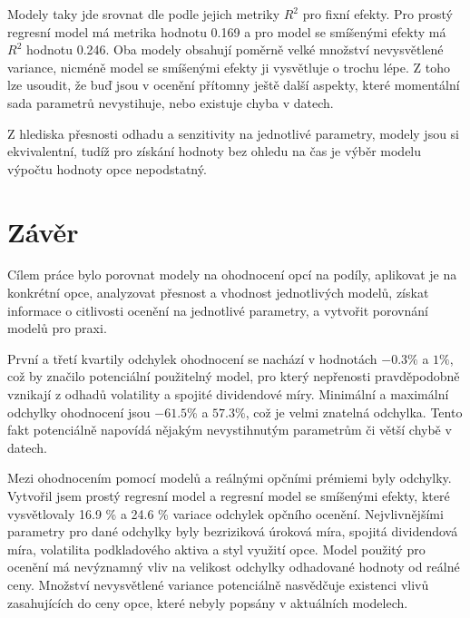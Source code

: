 \documentclass[male,czech,api_bc]{kitheses}
\begin{document}
  Modely taky jde srovnat dle podle jejich metriky $R^2$ pro fixní efekty. Pro prostý regresní model má metrika hodnotu 0.169 a pro model se smíšenými efekty má $R^2$ hodnotu 0.246.
  Oba modely obsahují poměrně velké množství nevysvětlené variance, nicméně model se smíšenými efekty ji vysvětluje o trochu lépe. Z toho lze usoudit, že buď jsou v ocenění přítomny ještě další aspekty, které momentální sada parametrů nevystihuje, nebo existuje chyba v datech.

  Z hlediska přesnosti odhadu a senzitivity na jednotlivé parametry, modely jsou si ekvivalentní, tudíž pro získání hodnoty bez ohledu na čas je výběr modelu výpočtu hodnoty opce nepodstatný.

  \chapter{Závěr}

  Cílem práce bylo porovnat modely na ohodnocení opcí na podíly, aplikovat je na konkrétní opce, analyzovat přesnost a vhodnost jednotlivých modelů, získat informace o citlivosti ocenění na jednotlivé parametry, a vytvořit porovnání modelů pro praxi.

  První a třetí kvartily odchylek ohodnocení se nachází v hodnotách $-0.3 \%$ a $1 \%$, což by značilo potenciální použitelný model, pro který nepřenosti pravděpodobně vznikají z odhadů volatility a spojité dividendové míry. Minimální a maximální odchylky ohodnocení jsou $-61.5 \%$ a $57.3 \%$, což je velmi znatelná odchylka. Tento fakt potenciálně napovídá nějakým nevystihnutým parametrům či větší chybě v datech.

  Mezi ohodnocením pomocí modelů a reálnými opčními prémiemi byly odchylky. Vytvořil jsem prostý regresní model a regresní model se smíšenými efekty, které vysvětlovaly 16.9 \% a 24.6 \% variace odchylek opčního ocenění. Nejvlivnějšími parametry pro dané odchylky byly bezriziková úroková míra, spojitá dividendová míra, volatilita podkladového aktiva a styl využití opce. Model použitý pro ocenění má nevýznamný vliv na velikost odchylky odhadované hodnoty od reálné ceny. Množství nevysvětlené variance potenciálně nasvědčuje existenci vlivů zasahujících do ceny opce, které nebyly popsány v aktuálních modelech.
\end{document}
